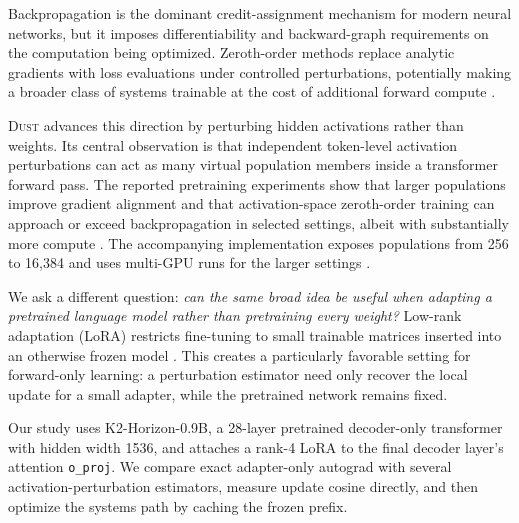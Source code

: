 \documentclass[11pt]{article}
\newcommand{\dust}{\textsc{Dust}}
\newcommand{\kmodel}{K2-Horizon-0.9B}
\newcommand{\oproj}{\texttt{o\_proj}}
\begin{document}
Backpropagation is the dominant credit-assignment mechanism for modern neural
networks, but it imposes differentiability and backward-graph requirements on
the computation being optimized. Zeroth-order methods replace analytic
gradients with loss evaluations under controlled perturbations, potentially
making a broader class of systems trainable at the cost of additional forward
compute \citep{salimans2017es,nesterov2017random,malladi2023zo}.

\dust{} advances this direction by perturbing hidden activations rather than
weights. Its central observation is that independent token-level activation
perturbations can act as many virtual population members inside a transformer
forward pass. The reported pretraining experiments show that larger
populations improve gradient alignment and that activation-space
zeroth-order training can approach or exceed backpropagation in selected
settings, albeit with substantially more compute \citep{dahal2026dust}.
The accompanying implementation exposes populations from 256 to 16,384 and
uses multi-GPU runs for the larger settings \citep{qlabsdustcode}.

We ask a different question: \emph{can the same broad idea be useful when
adapting a pretrained language model rather than pretraining every weight?}
Low-rank adaptation (LoRA) restricts fine-tuning to small trainable matrices
inserted into an otherwise frozen model \citep{hu2021lora}. This creates a
particularly favorable setting for forward-only learning: a perturbation
estimator need only recover the local update for a small adapter, while the
pretrained network remains fixed.

Our study uses \kmodel{}, a 28-layer pretrained decoder-only transformer with
hidden width 1536, and attaches a rank-4 LoRA to the final decoder layer's
attention \oproj{}. We compare exact adapter-only autograd with several
activation-perturbation estimators, measure update cosine directly, and then
optimize the systems path by caching the frozen prefix.
\end{document}
